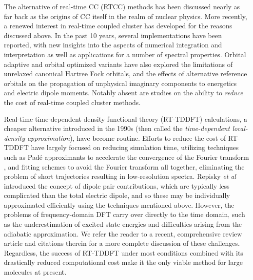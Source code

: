 The alternative of real-time CC (RTCC) methods has been discussed
nearly as far back as the origins of CC itself in the realm of nuclear
physics.\cite{Hoodbhoy1978,Hoodbhoy1979,Gunnarsson78} More recently, a
renewed interest in real-time coupled cluster has developed for the reasons
discussed above. In the past 10 years, several implementations have been
reported, \cite{Huber2011,Kvaal2012,Nascimento2019,Pedersen2019,Park2019}
with new insights into the aspects of numerical
integration\cite{Pedersen2019,Kristiansen2020} and
interpretation\cite{Pedersen2019,Pedersen2021} as
well as applications for a number of spectral properties.
\cite{Nascimento2016,Nascimento2017,Nascimento2019,Park2019,Park2021b}
Orbital adaptive\cite{Kvaal2012} and orbital optimized\cite{Sato2018}
variants have also explored the limitations of unrelaxed canonical
Hartree Fock orbitals, and the effects of alternative reference
orbitals on the propagation of unphysical imaginary components to
energetics and electric dipole moments. 
Notably absent are studies
on the ability to \textit{reduce} the cost of real-time coupled
cluster methods. 

Real-time time-dependent density functional theory
(RT-TDDFT) calculations, a cheaper alternative introduced in the 1990s
(then called the \textit{time-dependent local-density approximation}),
\cite{Yabana1996,Yabana1997,Yabana1999,Bertsch2000} have become routine.
\cite{Lopata2011,Castro2015,Tussupbayev2015,Goings2016a,Bruner2016,Goings2018,Sun2019a,Li2020}
Efforts to reduce the cost of RT-TDDFT have largely focused on reducing
simulation time, utilizing techniques such as Pad\'e approximants to
accelerate the convergence of the Fourier transform \cite{Bruner2016},
and fitting schemes to avoid the Fourier transform all together,
eliminating the problem of short trajectories resulting in low-resolution
spectra.\cite{Ding2013} Repisky \textit{et al} introduced the concept of 
dipole pair contributions,\cite{Repisky2015,Kadek2015}
which are typically less complicated than the total electric dipole,
and so these may be individually approximated efficiently using the 
techniques mentioned above.   
\cite{Bruner2016} However, the problems of frequency-domain DFT carry
over directly to the time domain, such as the underestimation of excited
state energies\cite{Peach2008} and difficulties arising from the adiabatic
approximation.\cite{Fuks2013,Fuks2015,Bruner2016} We refer the reader to
a recent, comprehensive review article\cite{Li2020} and citations therein
for a more complete discussion of these challenges. Regardless, the success
of RT-TDDFT under most conditions combined with its drastically reduced
computational cost make it the only viable method for large molecules
at present.

